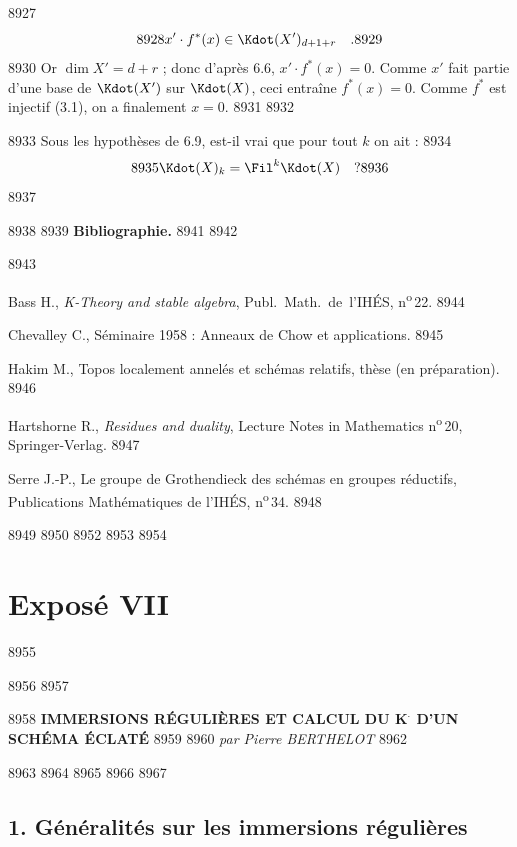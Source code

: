   8927	\[
  8928	x' \cdot f^{*}(x) \in \Kdot(X')_{d+1+r} \quad .
  8929	\]
  8930	Or $\dim X' = d + r$ ; donc d'apr\`es 6.6, $x' \cdot f^{*}(x) = 0$. Comme $x'$ fait partie d'une base de $\Kdot(X')$ sur $\Kdot(X)$, ceci entra\^ine $f^{*}(x) = 0$. Comme $f^{*}$ est injectif (3.1), on a finalement $x = 0$.
  8931	
  8932	\begin{probleme}[6.10]
  8933	Sous les hypoth\`eses de 6.9, est-il vrai que pour tout $k$ on ait :
  8934	\[
  8935	\Kdot(X)_k = \Fil^k \Kdot(X) \quad ?
  8936	\]
  8937	\end{probleme}
  8938	
  8939		\noindent\textbf{Bibliographie.}
  8941	
  8942	\begin{enumerate}[label={[\arabic*]}]
  8943	\item Bass H., \textit{K-Theory and stable algebra}, Publ.~Math.~de~l'IH\'ES, n\textsuperscript{o}\,22.
  8944	\item Chevalley C., S\'eminaire 1958 : Anneaux de Chow et applications.
  8945	\item Hakim M., Topos localement annel\'es et sch\'emas relatifs, th\`ese (en pr\'eparation).
  8946	\item Hartshorne R., \textit{Residues and duality}, Lecture Notes in Mathematics n\textsuperscript{o}\,20, Springer-Verlag.
  8947	\item Serre J.-P., Le groupe de Grothendieck des sch\'emas en groupes r\'eductifs, Publications Math\'ematiques de l'IH\'ES, n\textsuperscript{o}\,34.
  8948	\end{enumerate}
  8949	
  8950		%
  8952	%
  8953	%
  8954	\section*{Expos\'e VII}
  8955	
  8956	
  8957	\begin{center}
  8958	\textbf{\large IMMERSIONS R\'EGULI\`ERES ET CALCUL DU K$^{\boldsymbol{\cdot}}$ D'UN SCH\'EMA \'ECLAT\'E}
  8959	
  8960		\textit{par Pierre BERTHELOT}
  8962	\end{center}
  8963	
  8964	\setcounter{section}{1}
  8965	\setcounter{subsection}{0}
  8966	
  8967	\subsection*{1. G\'en\'eralit\'es sur les immersions r\'eguli\`eres}
